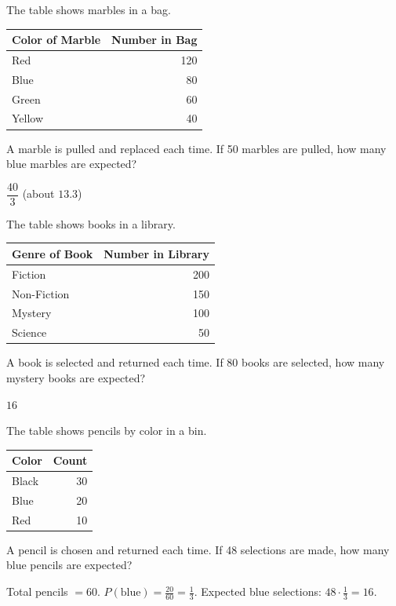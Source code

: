 

\question[5]
The table shows marbles in a bag.
\begin{center}
\begin{tabular}{|l|r|}
\hline
Color of Marble & Number in Bag \\
\hline
Red & 120 \\
\hline
Blue & 80 \\
\hline
Green & 60 \\
\hline
Yellow & 40 \\
\hline
\end{tabular}
\end{center}
A marble is pulled and replaced each time. If 50 marbles are pulled, how many blue marbles are expected?
\begin{solutionorbox}[0.8in]
\(\dfrac{40}{3}\) (about \(13.3\))
\end{solutionorbox}

\question[5]
The table shows books in a library.
\begin{center}
\begin{tabular}{|l|r|}
\hline
Genre of Book & Number in Library \\
\hline
Fiction & 200 \\
\hline
Non-Fiction & 150 \\
\hline
Mystery & 100 \\
\hline
Science & 50 \\
\hline
\end{tabular}
\end{center}
A book is selected and returned each time. If 80 books are selected, how many mystery books are expected?
\begin{solutionorbox}[0.8in]
\(16\)
\end{solutionorbox}

\question[5]
The table shows pencils by color in a bin.
\begin{center}
\begin{tabular}{|l|r|}
\hline
Color & Count \\
\hline
Black & 30 \\
\hline
Blue & 20 \\
\hline
Red & 10 \\
\hline
\end{tabular}
\end{center}
A pencil is chosen and returned each time. If 48 selections are made, how many blue pencils are expected?
\begin{choices}
\end{choices}
\begin{solution}
  Total pencils \(=60\). \(P(\text{blue})=\frac{20}{60}=\frac13\). Expected blue selections: \(48\cdot\frac13=16\).
\end{solution}

